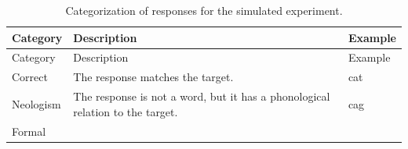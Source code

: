 \documentclass[12pt,]{krantz}
\theoremstyle{definition}
\theoremstyle{definition}
\theoremstyle{definition}
\theoremstyle{remark}
\begin{document}
\begin{longtable}[]{@{}lll@{}}
\caption{\label{tab:responses} Categorization of responses for the simulated
experiment.}\tabularnewline
\toprule
\begin{minipage}[b]{0.14\columnwidth}\raggedright\strut
Category\strut
\end{minipage} & \begin{minipage}[b]{0.70\columnwidth}\raggedright\strut
Description\strut
\end{minipage} & \begin{minipage}[b]{0.07\columnwidth}\raggedright\strut
Example\strut
\end{minipage}\tabularnewline
\midrule
\endfirsthead
\toprule
\begin{minipage}[b]{0.14\columnwidth}\raggedright\strut
Category\strut
\end{minipage} & \begin{minipage}[b]{0.70\columnwidth}\raggedright\strut
Description\strut
\end{minipage} & \begin{minipage}[b]{0.07\columnwidth}\raggedright\strut
Example\strut
\end{minipage}\tabularnewline
\midrule
\endhead
\begin{minipage}[t]{0.14\columnwidth}\raggedright\strut
Correct\strut
\end{minipage} & \begin{minipage}[t]{0.70\columnwidth}\raggedright\strut
The response matches the target.\strut
\end{minipage} & \begin{minipage}[t]{0.07\columnwidth}\raggedright\strut
cat\strut
\end{minipage}\tabularnewline
\begin{minipage}[t]{0.14\columnwidth}\raggedright\strut
Neologism\strut
\end{minipage} & \begin{minipage}[t]{0.70\columnwidth}\raggedright\strut
The response is not a word, but it has a phonological relation to the
target.\strut
\end{minipage} & \begin{minipage}[t]{0.07\columnwidth}\raggedright\strut
cag\strut
\end{minipage}\tabularnewline
\begin{minipage}[t]{0.14\columnwidth}\raggedright\strut
Formal\strut
\end{minipage} & \begin{minipage}[t]{0.70\columnwidth}\raggedright\strut

\end{minipage}
\end{longtable}
\end{document}
